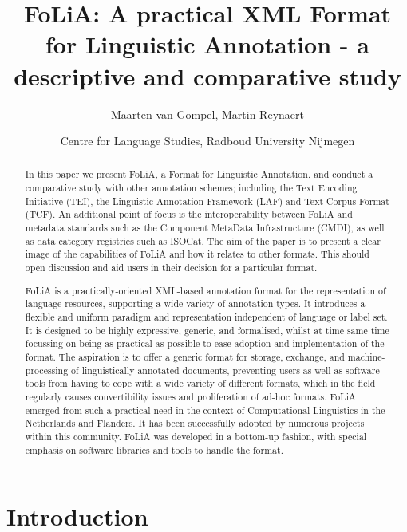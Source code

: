 \documentclass[a4paper,10pt,twoside]{article}
\title{FoLiA: A practical XML Format for Linguistic Annotation - a descriptive and comparative study}
\author{Maarten van Gompel, Martin Reynaert}
\date{Centre for Language Studies, Radboud University Nijmegen}
\begin{document}
\maketitle

\begin{abstract}

In this paper we present FoLiA, a Format for Linguistic Annotation, and conduct
a comparative study with other annotation schemes; including the
Text Encoding Initiative (TEI), the Linguistic Annotation Framework
(LAF) and Text Corpus Format (TCF). An additional point of focus is the
interoperability between FoLiA and metadata standards such as the Component
MetaData Infrastructure (CMDI), as well as data category registries such as
ISOCat. The aim of the paper is to present a clear image of the capabilities of
FoLiA and how it relates to other formats. This should open discussion and aid
users in their decision for a particular format.

FoLiA is a practically-oriented XML-based annotation format for the
representation of language resources, supporting a wide variety of annotation
types. It introduces a flexible and uniform paradigm and representation
independent of language or label set. It is designed to be highly
expressive, generic, and formalised, whilst at time same time focussing on
being as practical as possible to ease adoption and implementation of the
format. The aspiration is to offer a generic format for storage, exchange, and
machine-processing of linguistically annotated documents, preventing users as
well as software tools from having to cope with a wide variety of different
formats, which in the field regularly causes convertibility issues and
proliferation of ad-hoc formats. FoLiA emerged from such a practical need in
the context of Computational Linguistics in the Netherlands and Flanders. It
has been successfully adopted by numerous projects within this community. FoLiA
was developed in a bottom-up fashion, with special emphasis on software
libraries and tools to handle the format.

\end{abstract}

\section{Introduction}
\end{document}

